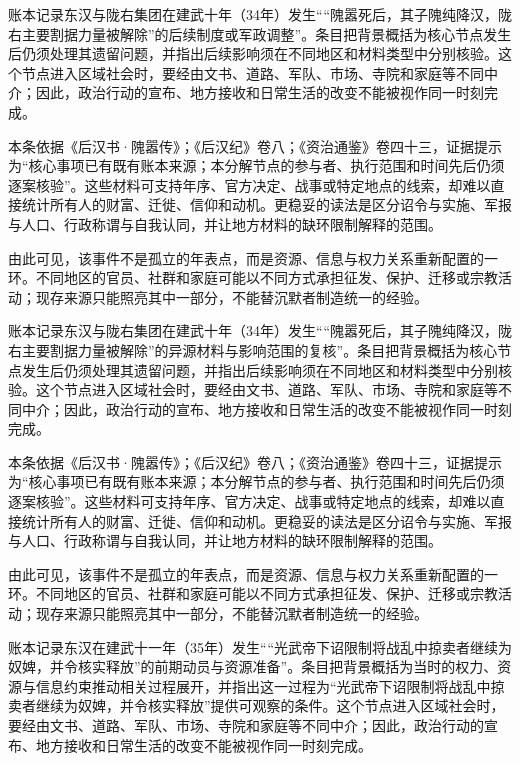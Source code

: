 账本记录东汉与陇右集团在建武十年（34年）发生““隗嚣死后，其子隗纯降汉，陇右主要割据力量被解除”的后续制度或军政调整”。条目把背景概括为核心节点发生后仍须处理其遗留问题，并指出后续影响须在不同地区和材料类型中分别核验。这个节点进入区域社会时，要经由文书、道路、军队、市场、寺院和家庭等不同中介；因此，政治行动的宣布、地方接收和日常生活的改变不能被视作同一时刻完成。

本条依据《后汉书·隗嚣传》；《后汉纪》卷八；《资治通鉴》卷四十三，证据提示为“核心事项已有既有账本来源；本分解节点的参与者、执行范围和时间先后仍须逐案核验”。这些材料可支持年序、官方决定、战事或特定地点的线索，却难以直接统计所有人的财富、迁徙、信仰和动机。更稳妥的读法是区分诏令与实施、军报与人口、行政称谓与自我认同，并让地方材料的缺环限制解释的范围。

由此可见，该事件不是孤立的年表点，而是资源、信息与权力关系重新配置的一环。不同地区的官员、社群和家庭可能以不同方式承担征发、保护、迁移或宗教活动；现存来源只能照亮其中一部分，不能替沉默者制造统一的经验。

账本记录东汉与陇右集团在建武十年（34年）发生““隗嚣死后，其子隗纯降汉，陇右主要割据力量被解除”的异源材料与影响范围的复核”。条目把背景概括为核心节点发生后仍须处理其遗留问题，并指出后续影响须在不同地区和材料类型中分别核验。这个节点进入区域社会时，要经由文书、道路、军队、市场、寺院和家庭等不同中介；因此，政治行动的宣布、地方接收和日常生活的改变不能被视作同一时刻完成。

本条依据《后汉书·隗嚣传》；《后汉纪》卷八；《资治通鉴》卷四十三，证据提示为“核心事项已有既有账本来源；本分解节点的参与者、执行范围和时间先后仍须逐案核验”。这些材料可支持年序、官方决定、战事或特定地点的线索，却难以直接统计所有人的财富、迁徙、信仰和动机。更稳妥的读法是区分诏令与实施、军报与人口、行政称谓与自我认同，并让地方材料的缺环限制解释的范围。

由此可见，该事件不是孤立的年表点，而是资源、信息与权力关系重新配置的一环。不同地区的官员、社群和家庭可能以不同方式承担征发、保护、迁移或宗教活动；现存来源只能照亮其中一部分，不能替沉默者制造统一的经验。

账本记录东汉在建武十一年（35年）发生““光武帝下诏限制将战乱中掠卖者继续为奴婢，并令核实释放”的前期动员与资源准备”。条目把背景概括为当时的权力、资源与信息约束推动相关过程展开，并指出这一过程为“光武帝下诏限制将战乱中掠卖者继续为奴婢，并令核实释放”提供可观察的条件。这个节点进入区域社会时，要经由文书、道路、军队、市场、寺院和家庭等不同中介；因此，政治行动的宣布、地方接收和日常生活的改变不能被视作同一时刻完成。

